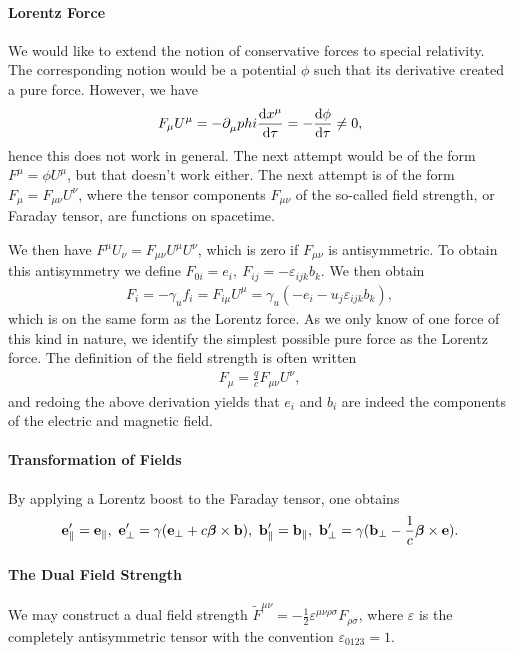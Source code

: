 \paragraph{Lorentz Force}
We would like to extend the notion of conservative forces to special relativity. The corresponding notion would be a potential $\phi$ such that its derivative created a pure force. However, we have
\begin{align*}
	F_{\mu}U^{\mu} = -\partial^{}_{\mu}phi\dv{x^{\mu}}{\tau} = -\dv{\phi}{\tau} \neq 0,
\end{align*}
hence this does not work in general. The next attempt would be of the form $F^{\mu} = \phi U^{\mu}$, but that doesn't work either. The next attempt is of the form $F_{\mu} = F_{\mu\nu}U^{\nu}$, where the tensor components $F_{\mu\nu}$ of the so-called field strength, or Faraday tensor, are functions on spacetime.

We then have $F^{\mu}U_{\nu} = F_{\mu\nu}U^{\mu}U^{\nu}$, which is zero if $F_{\mu\nu}$ is antisymmetric. To obtain this antisymmetry we define $F_{0i} = e_{i},\ F_{ij} = -\varepsilon_{ijk}b_{k}$. We then obtain
\begin{align*}
	F_{i} = -\gamma_{u}f_{i} = F_{i\mu}U^{\mu} = \gamma_{u}(-e_{i} - u_{j}\varepsilon_{ijk}b_{k}),
\end{align*}
which is on the same form as the Lorentz force. As we only know of one force of this kind in nature, we identify the simplest possible pure force as the Lorentz force. The definition of the field strength is often written
\begin{align*}
	F_{\mu} = \frac{q}{c}F_{\mu\nu}U^{\nu},
\end{align*}
and redoing the above derivation yields that $e_{i}$ and $b_{i}$ are indeed the components of the electric and magnetic field.

\paragraph{Transformation of Fields}
By applying a Lorentz boost to the Faraday tensor, one obtains
\begin{align*}
	\vb{e}_{\parallel}^{\prime} = \vb{e}_{\parallel},\ \vb{e}_{\perp}^{\prime} = \gamma(\vb{e}_{\perp} + c\vb*{\beta}\times\vb{b}),\ \vb{b}_{\parallel}^{\prime} = \vb{b}_{\parallel},\ \vb{b}_{\perp}^{\prime} = \gamma(\vb{b}_{\perp} - \frac{1}{c}\vb*{\beta}\times\vb{e}).
\end{align*}

\paragraph{The Dual Field Strength}
We may construct a dual field strength $\tilde{F}^{\mu\nu} = -\frac{1}{2}\varepsilon^{\mu\nu\rho\sigma}F_{\rho\sigma}$, where $\varepsilon$ is the completely antisymmetric tensor with the convention $\varepsilon_{0123} = 1$.

